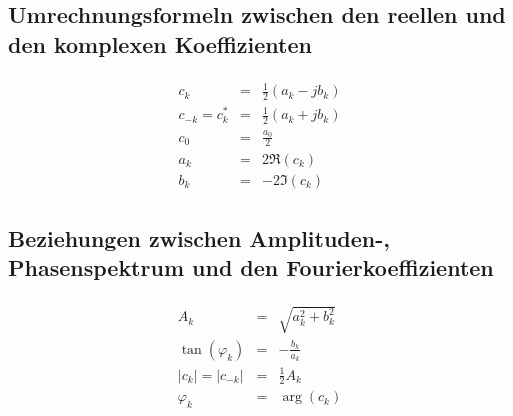 \newpage

\noindent
\subsection[Umrechnung reelle und komplexe Koeffizienten]{Umrechnungsformeln zwischen den reellen und den komplexen Koeffizienten}
\begin{align*}
\begin{array}{rcl}
c_k & = & \frac{1}{2} ( a_k - j b_k)\\
c_{-k} = c^{*}_{k} & = & \frac{1}{2} ( a_k + j b_k)\\
c_0 & = & \frac{a_0}{2}\\
a_k & = & 2 \Re(c_k)\\
b_k & = & -2 \Im(c_k)
\end{array}
\end{align*}
\subsection[Amplituden-, Phasenspektrum, Fourierkoeffizienten]{Beziehungen zwischen Amplituden-, Phasenspektrum und den Fourierkoeffizienten}

\begin{align*}
\begin{array}{rcl}
A_k & = & \sqrt{a_{k}^{2} + b_{k}^{2}}\\
\tan(\varphi_k) & = & - \frac{b_k}{a_k}\\
|c_k| = |c_{-k}| & = & \frac{1}{2} A_k\\
\varphi_k & = & \arg( c_k)
\end{array}
\end{align*}
